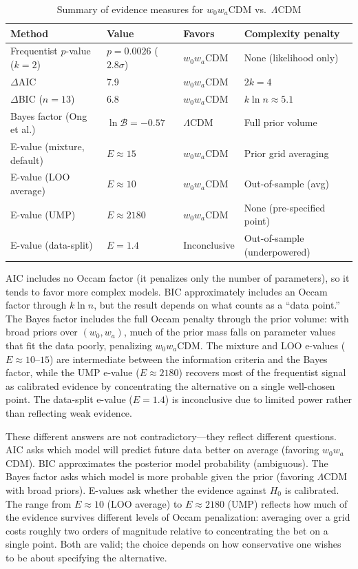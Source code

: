 \documentclass[11pt,a4paper]{article}
\newcommand{\LCDM}{$\Lambda$CDM}
\begin{document}
\begin{table}[H]
\centering
\caption{Summary of evidence measures for $w_0w_a$CDM vs.\ \LCDM}
\label{tab:evidence_summary}
\begin{tabular}{@{}llll@{}}
\toprule
\textbf{Method} & \textbf{Value} & \textbf{Favors} & \textbf{Complexity penalty} \\
\midrule
Frequentist $p$-value ($k=2$) & $p = 0.0026$ ($2.8\sigma$) & $w_0w_a$CDM & None (likelihood only) \\
$\Delta$AIC & 7.9 & $w_0w_a$CDM & $2k = 4$ \\
$\Delta$BIC ($n=13$) & 6.8 & $w_0w_a$CDM & $k\ln n \approx 5.1$ \\
Bayes factor (Ong et al.) & $\ln\mathcal{B} = -0.57$ & \LCDM & Full prior volume \\
E-value (mixture, default) & $E \approx 15$ & $w_0w_a$CDM & Prior grid averaging \\
E-value (LOO average) & $E \approx 10$ & $w_0w_a$CDM & Out-of-sample (avg) \\
E-value (UMP) & $E \approx 2180$ & $w_0w_a$CDM & None (pre-specified point) \\
E-value (data-split) & $E = 1.4$ & Inconclusive & Out-of-sample (underpowered) \\
\bottomrule
\end{tabular}
\end{table}

\noindent AIC includes no Occam factor (it penalizes only the number of parameters), so it tends to favor more complex models. BIC approximately includes an Occam factor through $k\ln n$, but the result depends on what counts as a ``data point.'' The Bayes factor includes the full Occam penalty through the prior volume: with broad priors over $(w_0, w_a)$, much of the prior mass falls on parameter values that fit the data poorly, penalizing $w_0w_a$CDM. The mixture and LOO e-values ($E \approx 10$--$15$) are intermediate between the information criteria and the Bayes factor, while the UMP e-value ($E \approx 2180$) recovers most of the frequentist signal as calibrated evidence by concentrating the alternative on a single well-chosen point. The data-split e-value ($E = 1.4$) is inconclusive due to limited power rather than reflecting weak evidence.

These different answers are not contradictory---they reflect different questions. AIC asks which model will predict future data better on average (favoring $w_0w_a$CDM). BIC approximates the posterior model probability (ambiguous). The Bayes factor asks which model is more probable given the prior (favoring \LCDM{} with broad priors). E-values ask whether the evidence against $H_0$ is calibrated. The range from $E \approx 10$ (LOO average) to $E \approx 2180$ (UMP) reflects how much of the evidence survives different levels of Occam penalization: averaging over a grid costs roughly two orders of magnitude relative to concentrating the bet on a single point. Both are valid; the choice depends on how conservative one wishes to be about specifying the alternative.
\end{document}
